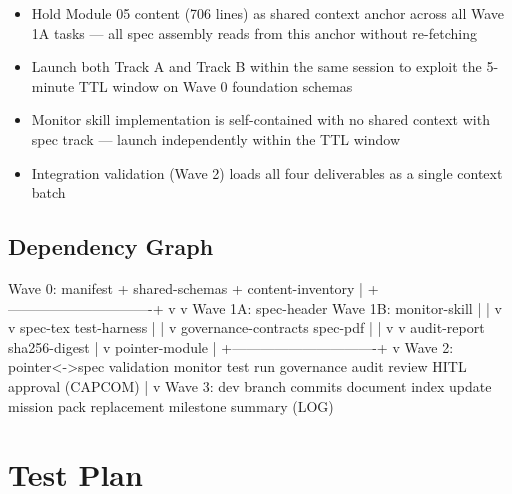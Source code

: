 \documentclass[11pt,letterpaper]{article}
\begin{document}
\begin{itemize}[noitemsep]
  \item Hold Module 05 content (706 lines) as shared context anchor across all Wave 1A tasks --- all spec assembly reads from this anchor without re-fetching
  \item Launch both Track A and Track B within the same session to exploit the 5-minute TTL window on Wave 0 foundation schemas
  \item Monitor skill implementation is self-contained with no shared context with spec track --- launch independently within the TTL window
  \item Integration validation (Wave 2) loads all four deliverables as a single context batch
\end{itemize}

\subsection{Dependency Graph}

\begin{asciibox}
Wave 0: manifest + shared-schemas + content-inventory
          |
          +-------------------------------+
          v                               v
Wave 1A: spec-header                  Wave 1B: monitor-skill
         |                                     |
         v                                     v
         spec-tex                         test-harness
         |                                     |
         v                             governance-contracts
         spec-pdf                              |
         |                                     v
         v                               audit-report
         sha256-digest
         |
         v
         pointer-module
         |
         +-------------------------------+
                         v
              Wave 2: pointer<->spec validation
                       monitor test run
                       governance audit review
                       HITL approval (CAPCOM)
                         |
                         v
              Wave 3: dev branch commits
                       document index update
                       mission pack replacement
                       milestone summary (LOG)
\end{asciibox}

\section{Test Plan}
\end{document}
